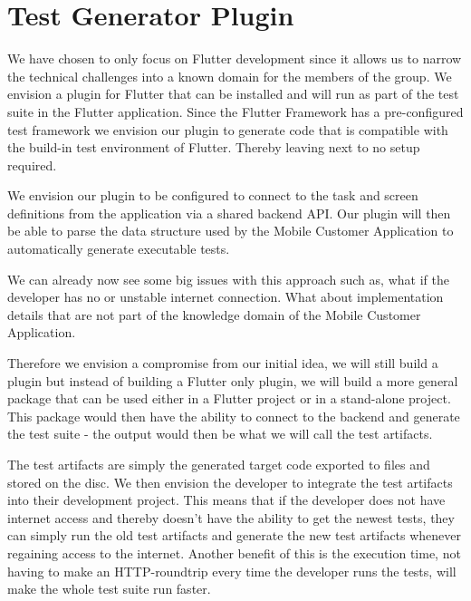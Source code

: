 \section{Test Generator Plugin}
We have chosen to only focus on Flutter development since it allows us to narrow the technical challenges into a known domain for the members of the group.
We envision a plugin for Flutter that can be installed and will run as part of the test suite in the Flutter application.
Since the Flutter Framework has a pre-configured test framework we envision our plugin to generate code that is compatible with the build-in test environment of Flutter.
Thereby leaving next to no setup required.

We envision our plugin to be configured to connect to the task and screen definitions from the application via a shared backend API.
Our plugin will then be able to parse the data structure used by the Mobile Customer Application to automatically generate executable tests.

We can already now see some big issues with this approach such as, what if the developer has no or unstable internet connection.
What about implementation details that are not part of the knowledge domain of the Mobile Customer Application.

Therefore we envision a compromise from our initial idea, we will still build a plugin but instead of building a Flutter only plugin, we will build a more general package that can be used either in a Flutter project or in a stand-alone project. 
This package would then have the ability to connect to the backend and generate the test suite - the output would then be what we will call the test artifacts.

The test artifacts are simply the generated target code exported to files and stored on the disc. We then envision the developer to integrate the test artifacts into their development project. 
This means that if the developer does not have internet access and thereby doesn't have the ability to get the newest tests, they can simply run the old test artifacts and generate the new test artifacts whenever regaining access to the internet. Another benefit of this is the execution time, not having to make an HTTP-roundtrip every time the developer runs the tests, will make the whole test suite run faster.

